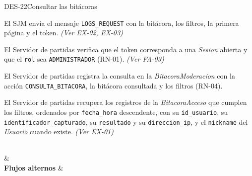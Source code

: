 \begin{fichacu}{DES-22}{Consultar las bitácoras}
{\begin{cuenum}[start=1]
      \item El SJM envía el mensaje \texttt{LOGS\_\allowbreak{}REQUEST} con la bitácora, los filtros, la primera página y el token. \textit{(Ver \mbox{EX-02}, \mbox{EX-03})}
      \item El Servidor de partidas verifica que el token corresponda a una \textit{Sesion} abierta y que el \texttt{rol} sea \texttt{ADMINISTRADOR} (\mbox{RN-01}). \textit{(Ver \mbox{FA-03})}
      \item El Servidor de partidas registra la consulta en la \textit{BitacoraModeracion} con la acción \texttt{CONSULTA\_\allowbreak{}BITACORA}, la bitácora consultada y los filtros (\mbox{RN-04}).
      \item El Servidor de partidas recupera los registros de la \textit{BitacoraAcceso} que cumplen los filtros, ordenados por \texttt{fecha\_\allowbreak{}hora} descendente, con su \texttt{id\_\allowbreak{}usuario}, su \texttt{identificador\_\allowbreak{}capturado}, su \texttt{resultado} y su \texttt{direccion\_\allowbreak{}ip}, y el \texttt{nickname} del \textit{Usuario} cuando existe. \textit{(Ver \mbox{EX-01})}
    \end{cuenum}} \\
   &  \\ \hline
  \textbf{Flujos alternos} & 
\end{fichacu}
